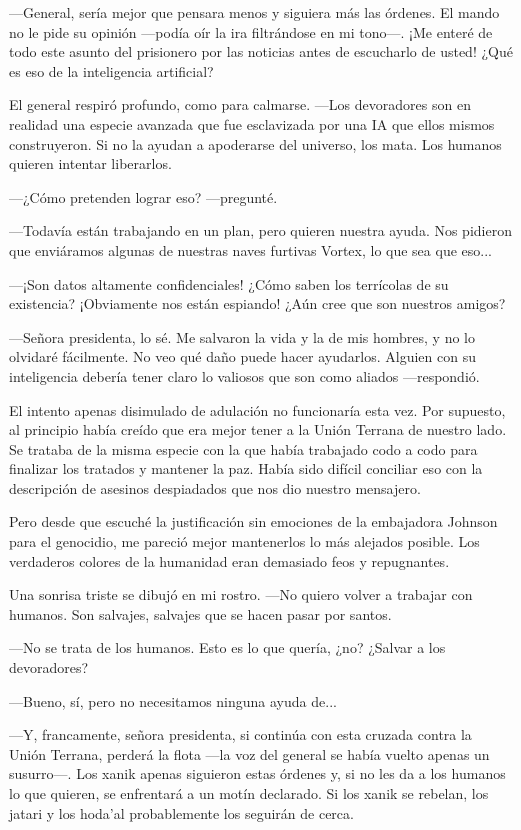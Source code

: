 —General, sería mejor que pensara menos y siguiera más las órdenes. El mando no le pide su opinión —podía oír la ira filtrándose en mi tono—. ¡Me enteré de todo este asunto del prisionero por las noticias antes de escucharlo de usted! ¿Qué es eso de la inteligencia artificial?

El general respiró profundo, como para calmarse. —Los devoradores son en realidad una especie avanzada que fue esclavizada por una IA que ellos mismos construyeron. Si no la ayudan a apoderarse del universo, los mata. Los humanos quieren intentar liberarlos.

 —¿Cómo pretenden lograr eso? —pregunté.

—Todavía están trabajando en un plan, pero quieren nuestra ayuda. Nos pidieron que enviáramos algunas de nuestras naves furtivas Vortex, lo que sea que eso...

—¡Son datos altamente confidenciales! ¿Cómo saben los terrícolas de su existencia? ¡Obviamente nos están espiando! ¿Aún cree que son nuestros amigos?

—Señora presidenta, lo sé. Me salvaron la vida y la de mis hombres, y no lo olvidaré fácilmente. No veo qué daño puede hacer ayudarlos. Alguien con su inteligencia debería tener claro lo valiosos que son como aliados —respondió.

El intento apenas disimulado de adulación no funcionaría esta vez. Por supuesto, al principio había creído que era mejor tener a la Unión Terrana de nuestro lado. Se trataba de la misma especie con la que había trabajado codo a codo para finalizar los tratados y mantener la paz. Había sido difícil conciliar eso con la descripción de asesinos despiadados que nos dio nuestro mensajero.

Pero desde que escuché la justificación sin emociones de la embajadora Johnson para el genocidio, me pareció mejor mantenerlos lo más alejados posible. Los verdaderos colores de la humanidad eran demasiado feos y repugnantes.

Una sonrisa triste se dibujó en mi rostro. —No quiero volver a trabajar con humanos. Son salvajes, salvajes que se hacen pasar por santos.

—No se trata de los humanos. Esto es lo que quería, ¿no? ¿Salvar a los devoradores?

—Bueno, sí, pero no necesitamos ninguna ayuda de...

—Y, francamente, señora presidenta, si continúa con esta cruzada contra la Unión Terrana, perderá la flota —la voz del general se había vuelto apenas un susurro—. Los xanik apenas siguieron estas órdenes y, si no les da a los humanos lo que quieren, se enfrentará a un motín declarado. Si los xanik se rebelan, los jatari y los hoda'al probablemente los seguirán de cerca.

